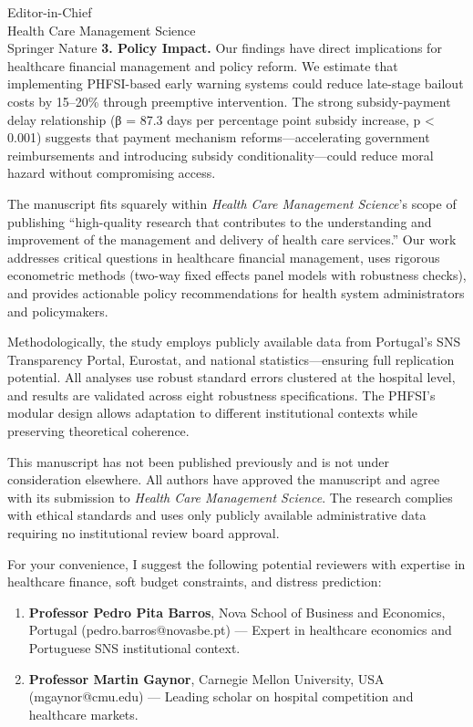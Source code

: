 \documentclass[11pt]{letter}
\begin{document}
\begin{letter}{
Editor-in-Chief \\
Health Care Management Science \\
Springer Nature
}
\textbf{3. Policy Impact.} Our findings have direct implications for healthcare financial management and policy reform. We estimate that implementing PHFSI-based early warning systems could reduce late-stage bailout costs by 15--20\% through preemptive intervention. The strong subsidy-payment delay relationship (β = 87.3 days per percentage point subsidy increase, p < 0.001) suggests that payment mechanism reforms---accelerating government reimbursements and introducing subsidy conditionality---could reduce moral hazard without compromising access.

The manuscript fits squarely within \textit{Health Care Management Science}'s scope of publishing ``high-quality research that contributes to the understanding and improvement of the management and delivery of health care services.'' Our work addresses critical questions in healthcare financial management, uses rigorous econometric methods (two-way fixed effects panel models with robustness checks), and provides actionable policy recommendations for health system administrators and policymakers.

Methodologically, the study employs publicly available data from Portugal's SNS Transparency Portal, Eurostat, and national statistics---ensuring full replication potential. All analyses use robust standard errors clustered at the hospital level, and results are validated across eight robustness specifications. The PHFSI's modular design allows adaptation to different institutional contexts while preserving theoretical coherence.

This manuscript has not been published previously and is not under consideration elsewhere. All authors have approved the manuscript and agree with its submission to \textit{Health Care Management Science}. The research complies with ethical standards and uses only publicly available administrative data requiring no institutional review board approval.

For your convenience, I suggest the following potential reviewers with expertise in healthcare finance, soft budget constraints, and distress prediction:

\begin{enumerate}
    \item \textbf{Professor Pedro Pita Barros}, Nova School of Business and Economics, Portugal (pedro.barros@novasbe.pt) --- Expert in healthcare economics and Portuguese SNS institutional context.

    \item \textbf{Professor Martin Gaynor}, Carnegie Mellon University, USA (mgaynor@cmu.edu) --- Leading scholar on hospital competition and healthcare markets.


\end{enumerate}
\end{letter}
\end{document}
